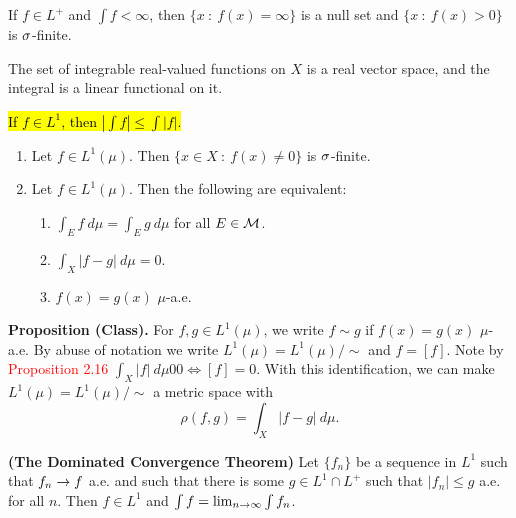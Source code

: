 \vs

\begin{prop}
If $f\in L^+$ and $\int f < \infty$, then $\{x\ :\ f(x) = \infty\}$ is a null set and $\{x\ :\ f(x) > 0 \}$ is $\sigma$-finite.
\end{prop}

\vs

\begin{prop}
The set of integrable real-valued functions on $X$ is a real vector space, and the integral is a linear functional on it.
\end{prop}

\vs

\begin{prop}
\hl{If $f\in L^1$, then $|\int f| \leq \int |f|$.}
\end{prop}

\vs

\begin{prop}\nl
\begin{enumerate}[\hspace{1em}(a)]
    \item Let $f\in L^1(\mu)$. Then $\{x\in X\ :\ f(x) \neq 0\}$ is $\sigma$-finite.
    \item Let $f \in L^1(\mu)$. Then the following are equivalent:
    \begin{enumerate}[\hspace{1em}(i)]
        \item $\int_E f\ d\mu = \int_E g\ d\mu$ for all $E\in \mathcal{M}$.
        \item $\int_X|f - g|\ d\mu = 0$.
        \item $f(x) = g(x)$ $\mu$-a.e.
    \end{enumerate}
\end{enumerate}
\end{prop}

\vs

\textbf{Proposition (Class).} For $f,g\in L^1(\mu)$, we write $f\sim g$ if $f(x) = g(x)$ $\mu$-a.e. By abuse of notation we write $L^1(\mu) = L^1(\mu)/\sim$ and $f = [f]$. Note by \textcolor{red}{Proposition 2.16} $\int_X |f|\ d\mu 0 0 \Leftrightarrow [f] = 0$. With this identification, we can make $L^1(\mu) = L^1(\mu)/\sim$ a metric space with
\[\rho(f,g) = \int_X|f - g|\ d\mu.\]

\vs
\begin{thm}\textbf{(The Dominated Convergence Theorem)}
Let $\{f_n\}$ be a sequence in $L^1$ such that $f_n\rightarrow f$ a.e. and such that there is some $g\in L^1 \cap L^+$ such that $|f_n| \leq g$ a.e. for all $n$. Then $f\in L^1$ and $\int f = \lim_{n\rightarrow \infty} \int f_n$.
\end{thm}

